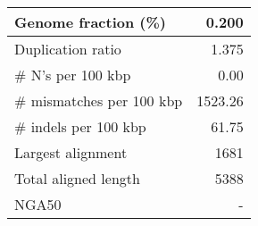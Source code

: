 \documentclass[12pt,a4paper]{article}
\begin{document}
\begin{table}[ht]
\begin{center}
\begin{tabular}{|l*{1}{|r}|}
Genome fraction (\%) & 0.200 \\ \hline
Duplication ratio & 1.375 \\ \hline
\# N's per 100 kbp & 0.00 \\ \hline
\# mismatches per 100 kbp & 1523.26 \\ \hline
\# indels per 100 kbp & 61.75 \\ \hline
Largest alignment & 1681 \\ \hline
Total aligned length & 5388 \\ \hline
NGA50 & - \\ \hline
\end{tabular}
\end{center}
\end{table}
\end{document}
